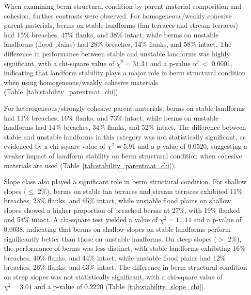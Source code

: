 \documentclass[review]{elsarticle}
\begin{document}
When examining berm structural condition by parent material composition and cohesion, further contrasts were observed. For homogeneous/weakly cohesive parent materials, berms on stable landforms (fan terraces and stream terraces) had 15\% breaches, 47\% flanks, and 38\% intact, while berms on unstable landforms (flood plains) had 28\% breaches, 14\% flanks, and 58\% intact. The difference in performance between stable and unstable landforms was highly significant, with a chi-square value of $\chi^2 = 31.31$ and a p-value of $<$ 0.0001, indicating that landform stability plays a major role in berm structural condition when using homogeneous/weakly cohesive materials (Table~\ref{tab:stability_parentmat_chi}).

For heterogeneous/strongly cohesive parent materials, berms on stable landforms had 11\% breaches, 16\% flanks, and 73\% intact, while berms on unstable landforms had 14\% breaches, 34\% flanks, and 52\% intact. The difference between stable and unstable landforms in this category was not statistically significant, as evidenced by a chi-square value of $\chi^2 = 5.91$ and a p-value of 0.0520, suggesting a weaker impact of landform stability on berm structural condition when cohesive materials are used (Table~\ref{tab:stability_parentmat_chi}).

Slope class also played a significant role in berm structural condition. For shallow slopes ($\leq$ 2\%), berms on stable fan terraces and stream terraces exhibited 11\% breaches, 23\% flanks, and 65\% intact, while unstable flood plains on shallow slopes showed a higher proportion of breached berms at 27\%, with 19\% flanked and 54\% intact. A chi-square test yielded a value of $\chi^2 = 11.14$ and a p-value of 0.0038, indicating that berms on shallow slopes on stable landforms perform significantly better than those on unstable landforms. On steep slopes ($>$ 2\%), the performance of berms was less distinct, with stable landforms exhibiting 16\% breaches, 40\% flanks, and 44\% intact, while unstable flood plains had 12\% breaches, 26\% flanks, and 63\% intact. The difference in berm structural condition on steep slopes was not statistically significant, with a chi-square value of $\chi^2 = 3.01$ and a p-value of 0.2220 (Table~\ref{tab:stability_slope_chi}).
\end{document}

